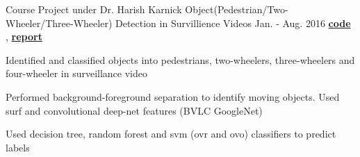 \begin{cventries}
	\cventry
	{Course Project under Dr. Harish Karnick} %
	{Object(Pedestrian/Two-Wheeler/Three-Wheeler) Detection in Survillience Videos} %
	{Jan. - Aug. 2016} %
	{
		\textbf{\href{https://github.com/submagr/MLT-Classifier}{code \ExternalLink}}, 
		\textbf{\href{https://www.dropbox.com/s/sh69si90hl7mtxr/MLTProjectReport.pdf?dl=0}{report \ExternalLink}}	
	} %
	{
		\begin{cvitems} %
			\item {Identified and classified objects into pedestrians, two-wheelers, three-wheelers and four-wheeler in surveillance video}
			\item {Performed background-foreground separation to identify moving objects. Used surf and convolutional deep-net features (BVLC GoogleNet)}
			\item {Used decision tree, random forest and svm (ovr and ovo) classifiers to predict labels}
		\end{cvitems}
	}
%	
%	
%	

\end{cventries}
